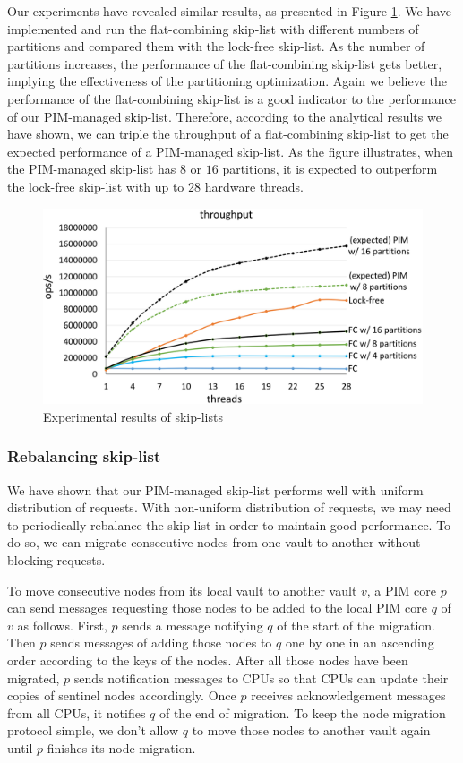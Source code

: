 Our experiments have revealed similar results, 
as presented in Figure \ref{figure:skiplist_data}.
We have implemented and run the flat-combining skip-list with different numbers of
partitions and compared them with the lock-free skip-list.
As the number of partitions increases, the performance of the flat-combining skip-list
gets better, implying the effectiveness of the partitioning optimization.
Again we believe the performance of the flat-combining skip-list is a good indicator
to the performance of our PIM-managed skip-list.
Therefore, according to the analytical results we have shown, we can triple the throughput
of a flat-combining skip-list to get the expected performance of a PIM-managed skip-list.
As the figure illustrates, when the PIM-managed skip-list has $8$ or $16$ partitions,
it is expected to outperform the lock-free skip-list with up to 28 hardware threads.

\begin{figure}[ht!]
    \centering
    \includegraphics[width=1.0\linewidth]{skiplist_data.eps} %
    \caption{Experimental results of skip-lists}
    \label{figure:skiplist_data}
\end{figure}


\subsubsection{Rebalancing skip-list}
We have shown that our PIM-managed skip-list performs well with uniform distribution of requests. 
With non-uniform distribution of requests, we may need to periodically rebalance the skip-list 
in order to maintain good performance. 
To do so, we can migrate consecutive nodes from one vault to another without blocking requests.  

To move consecutive nodes from its local vault to another vault $v$, a PIM core $p$ 
can send messages requesting those nodes to be added to the local PIM core $q$ of $v$ as follows. 
First, $p$ sends a message notifying $q$ of the start of the migration. 
Then $p$ sends messages of adding those nodes to $q$ one by one in an ascending order 
according to the keys of the nodes. 
After all those nodes have been migrated, $p$ sends notification messages to CPUs so that 
CPUs can update their copies of sentinel nodes accordingly.
Once $p$ receives acknowledgement messages from all CPUs, it notifies $q$ of the end of migration.
To keep the node migration protocol simple, we don't allow $q$ to move those nodes 
to another vault again until $p$ finishes its node migration. 

